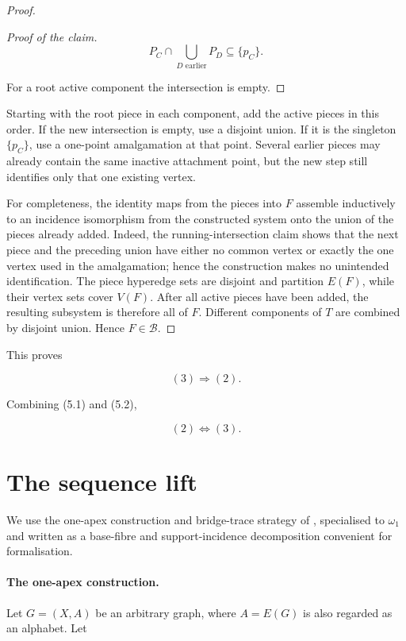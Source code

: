 \documentclass[a4paper,11pt,reqno]{amsart}
\theoremstyle{plain}
\theoremstyle{definition}
\theoremstyle{remark}
\begin{document}
\begin{proof}
\begin{proof}[Proof of the claim]
\[
P_C\cap\bigcup_{D\text{ earlier}}P_D\subseteq\{p_C\}.
\]

For a root active component the intersection is empty.
\end{proof}

Starting with the root piece in each component, add the active pieces in this
order. If the new intersection is empty, use a disjoint union. If it is the
singleton \(\{p_C\}\), use a one-point amalgamation at that point. Several
earlier pieces may already contain the same inactive attachment point, but
the new step still identifies only that one existing vertex.

For completeness, the identity maps from the pieces into \(F\) assemble
inductively to an incidence isomorphism from the constructed system onto the
union of the pieces already added. Indeed, the running-intersection claim
shows that the next piece and the preceding union have either no common
vertex or exactly the one vertex used in the amalgamation; hence the
construction makes no unintended identification. The piece hyperedge sets
are disjoint and partition \(E(F)\), while their vertex sets cover \(V(F)\).
After all active pieces have been added, the resulting subsystem is therefore
all of \(F\). Different components of \(T\) are combined by disjoint union.
Hence \(F\in\mathcal B\).
\end{proof}

This proves

\[
(3)\Longrightarrow(2). \tag{5.2}
\]

Combining (5.1) and (5.2),

\[
(2)\Longleftrightarrow(3). \tag{5.3}
\]

\section{The sequence lift}\label{the-sequence-lift-used-in-the-avoidance-constructions}

We use the one-apex construction and bridge-trace strategy of
\citet[Sections~3--4 and Theorem~4.6]{li2026}, specialised to $\omega_1$ and
written as a base-fibre and support-incidence decomposition convenient for
formalisation.

\paragraph{The one-apex construction.}\label{the-one-apex-construction}

Let \(G=(X,A)\) be an arbitrary graph, where \(A=E(G)\) is also regarded as an alphabet. Let
\end{document}
